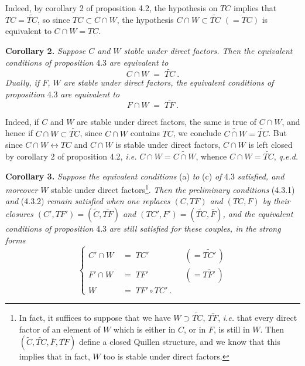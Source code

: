 
Indeed, by corollary 2 of proposition 4.2, the hypothesis on $TC$ implies that $TC = \widetilde{TC}$, so since $TC \subset C{\cap}W$, the hypothesis $C{\cap}W \subset \widetilde{TC}$ $(= TC)$ is equivalent to $C{\cap}W = TC$.

\textbf{Corollary 2.} \textit{Suppose $C$ and $W$ stable under direct factors. Then the equivalent conditions of proposition} 4.3 \textit{are equivalent to}
\[
C\cap W \;=\; \widetilde{TC}\ . \tag*{(4.3.5)}
\]
\textit{Dually, if $F$, $W$ are stable under direct factors, the equivalent conditions of proposition} 4.3 \textit{are equivalent to}
\[
F\cap W \;=\; \overline{TF}\ . \tag*{(4.3.5$'$)}
\]

Indeed, if $C$ and $W$ are stable under direct factors, the same is true of $C\cap W$, and hence if $C\cap W\subset\widetilde{TC}$, since $C\cap W$ contains $TC$, we conclude $\widetilde{C\cap W}=\widetilde{TC}$. But since $C\cap W\longleftrightarrow TC$ and $C\cap W$ is stable under direct factors, $C\cap W$ is left closed by corollary 2 of proposition 4.2, \textit{i.e.} $C\cap W=\widetilde{C\cap W}$, whence $C\cap W=\widetilde{TC}$, \quad \textit{q.e.d.}

\textbf{Corollary 3.} \textit{Suppose the equivalent conditions} (a) \textit{to} (c) \textit{of} 4.3 \textit{satisfied, and moreover} $W$ stable under direct factors\footnote[12]{In fact, it suffices to suppose that we have $W\supset\widetilde{TC}$, $\overline{TF}$, \textit{i.e.} that every direct factor of an element of $W$ which is either in $C$, or in $F$, is still in $W$. Then $(\widetilde{C},\widetilde{TC},\bar{F},\overline{TF})$ define a closed Quillen structure, and we know that this implies that in fact, $W$ too is stable under direct factors.}. \textit{Then the preliminary conditions} (4.3.1) \textit{and} (4.3.2) \textit{remain satisfied when one replaces $(C,TF)$ and $(TC,F)$ by their closures $(C',TF')=(\widetilde{C},\overline{TF})$ and $(TC',F')=(\widetilde{TC},\bar{F})$, and the equivalent conditions of proposition} 4.3 \textit{are still satisfied for these couples, in the strong forms}
\[
\left\{
\begin{aligned}
C'\cap W &\;=\; TC' && (=\widetilde{TC'}\,)\\
F'\cap W &\;=\; TF' && (=\overline{TF'}\,)\\
W &\;=\; TF'\circ TC'\ .
\end{aligned}
\right.
\tag*{(4.3.6)}
\]

